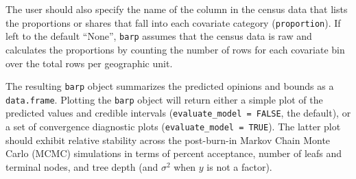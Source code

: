 \documentclass[]{article}
\newenvironment{Shaded}{\begin{snugshade}}{\end{snugshade}}
\newcommand{\KeywordTok}[1]{\textcolor[rgb]{0.13,0.29,0.53}{\textbf{#1}}}
\newcommand{\DataTypeTok}[1]{\textcolor[rgb]{0.13,0.29,0.53}{#1}}
\newcommand{\StringTok}[1]{\textcolor[rgb]{0.31,0.60,0.02}{#1}}
\newcommand{\OtherTok}[1]{\textcolor[rgb]{0.56,0.35,0.01}{#1}}
\newcommand{\OperatorTok}[1]{\textcolor[rgb]{0.81,0.36,0.00}{\textbf{#1}}}
\newcommand{\NormalTok}[1]{#1}
\begin{document}
The user should also specify the name of the column in the census data
that lists the proportions or shares that fall into each covariate
category (\texttt{proportion}). If left to the default ``None'',
\texttt{barp} assumes that the census data is raw and calculates the
proportions by counting the number of rows for each covariate bin over
the total rows per geographic unit.

\begin{Shaded}
\end{Shaded}

The resulting \texttt{barp} object summarizes the predicted opinions and
bounds as a \texttt{data.frame}. Plotting the \texttt{barp} object will
return either a simple plot of the predicted values and credible
intervals (\texttt{evaluate\_model\ =\ FALSE}, the default), or a set of
convergence diagnostic plots (\texttt{evaluate\_model\ =\ TRUE}). The
latter plot should exhibit relative stability across the post-burn-in
Markov Chain Monte Carlo (MCMC) simulations in terms of percent
acceptance, number of leafs and terminal nodes, and tree depth (and
\(\sigma^2\) when \(y\) is not a factor).
\end{document}
